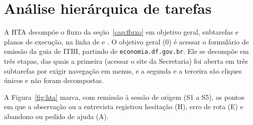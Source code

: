\documentclass[
  12pt,
  oneside,
  a4paper,
  chapter=TITLE,
  section=TITLE,
  english,
  brazilian
]{abntex2}
\begin{document}
\chapter{Análise hierárquica de tarefas}\label{cap:hta}


A HTA decompõe o fluxo da seção~\ref{cap:fluxo} em objetivo geral, subtarefas
e planos de execução, na linha de  e
. O objetivo geral (0) é acessar o formulário de emissão
da guia de ITBI, partindo de \texttt{economia.df.gov.br}. Ele se decompõe em três
etapas, das quais a primeira (acessar o site da Secretaria) foi aberta em três
subtarefas por exigir navegação em menus, e a segunda e a terceira são cliques
únicos e não foram decompostas.

A Figura~\ref{fig:hta} marca, com remissão à sessão de origem (S1 a S5), os pontos em que a
observação ou a entrevista registrou hesitação (H), erro de rota (E) e abandono
ou pedido de ajuda (A).
\end{document}
